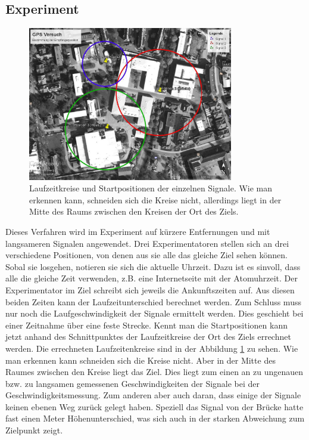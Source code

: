 \documentclass[12pt,a4paper,titlepage,headinclude]{scrartcl}
\numberwithin{equation}{subsection}
\begin{document}
\subsection{Experiment}
\begin{figure}[!h]
\centering
\includegraphics[width=0.8\textwidth]{GPS.jpg}
\caption{Laufzeitkreise und Startpositionen der einzelnen Signale. Wie man erkennen kann, schneiden sich die Kreise nicht, allerdings liegt in der Mitte des Raums zwischen den Kreisen der Ort des Ziels.}
\label{fig:GPS}
\end{figure}
Dieses Verfahren wird im Experiment auf kürzere Entfernungen und mit langsameren Signalen angewendet.
Drei Experimentatoren stellen sich an drei verschiedene Positionen, von denen aus sie alle das gleiche Ziel sehen können.
Sobal sie losgehen, notieren sie sich die aktuelle Uhrzeit.
Dazu ist es sinvoll, dass alle die gleiche Zeit verwenden, z.B. eine Internetseite mit der Atomuhrzeit.
Der Experimentator im Ziel schreibt sich jeweils die Ankunftszeiten auf.
Aus diesen beiden Zeiten kann der Laufzeitunterschied berechnet werden.
Zum Schluss muss nur noch die Laufgeschwindigkeit der Signale ermittelt werden.
Dies geschieht bei einer Zeitnahme über eine feste Strecke.
Kennt man die Startpositionen kann jetzt anhand des Schnittpunktes der Laufzeitkreise der Ort des Ziels errechnet werden.
Die errechneten Laufzeitenkreise sind in der Abbildung \ref{fig:GPS} zu sehen.
Wie man erkennen kann schneiden sich die Kreise nicht.
Aber in der Mitte des Raumes zwischen den Kreise liegt das Ziel.
Dies liegt zum einen an zu ungenauen bzw. zu langsamen gemessenen Geschwindigkeiten der Signale bei der Geschwindigkeitsmessung.
Zum anderen aber auch daran, dass einige der Signale keinen ebenen Weg zurück gelegt haben.
Speziell das Signal von der Brücke hatte fast einen Meter Höhenunterschied, was sich auch in der starken Abweichung zum Zielpunkt zeigt.
\end{document}

